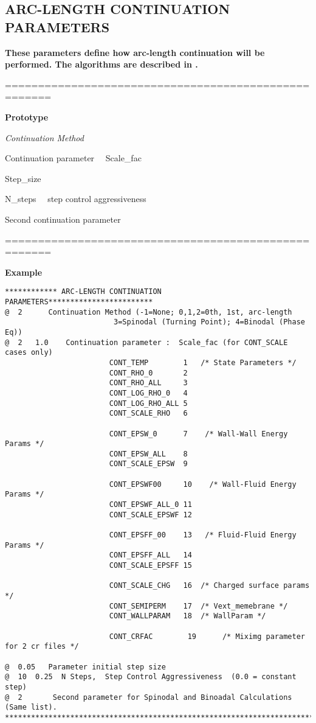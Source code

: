 \documentclass[10pt,onecolumn]{article}
\begin{document}
\vfill
\break
\subsection{ARC-LENGTH CONTINUATION PARAMETERS}
{\bf  These parameters define
how arc-length continuation will be performed.  The algorithms are described in \cite{salinger}. }

\noindent=====================================================

{\bf Prototype}

{\it  Continuation Method

Continuation parameter \ \  Scale\_fac

Step\_size

N\_steps  \ \ step control aggressiveness

Second continuation parameter

}

\noindent=====================================================

{\bf Example}

\begin{verbatim}
************ ARC-LENGTH CONTINUATION PARAMETERS************************
@  2      Continuation Method (-1=None; 0,1,2=0th, 1st, arc-length
                         3=Spinodal (Turning Point); 4=Binodal (Phase Eq))
@  2   1.0    Continuation parameter :  Scale_fac (for CONT_SCALE cases only)
                        CONT_TEMP        1   /* State Parameters */
                        CONT_RHO_0       2
                        CONT_RHO_ALL     3
                        CONT_LOG_RHO_0   4
                        CONT_LOG_RHO_ALL 5
                        CONT_SCALE_RHO   6

                        CONT_EPSW_0      7    /* Wall-Wall Energy Params */
                        CONT_EPSW_ALL    8
                        CONT_SCALE_EPSW  9

                        CONT_EPSWF00     10    /* Wall-Fluid Energy Params */
                        CONT_EPSWF_ALL_0 11
                        CONT_SCALE_EPSWF 12

                        CONT_EPSFF_00    13   /* Fluid-Fluid Energy Params */
                        CONT_EPSFF_ALL   14
                        CONT_SCALE_EPSFF 15

                        CONT_SCALE_CHG   16  /* Charged surface params */
                        CONT_SEMIPERM    17  /* Vext_memebrane */
                        CONT_WALLPARAM   18  /* WallParam */
                                                                                                                    
                        CONT_CRFAC        19      /* Miximg parameter for 2 cr files */
                                                                                                                   
@  0.05   Parameter initial step size
@  10  0.25  N Steps,  Step Control Aggressiveness  (0.0 = constant step)
@  2       Second parameter for Spinodal and Binoadal Calculations (Same list).
***********************************************************************
\end{verbatim}
\end{document}
